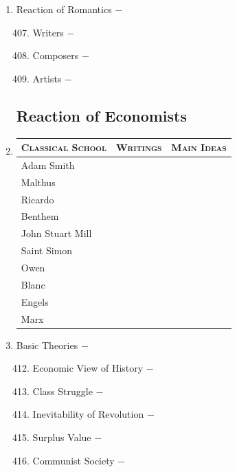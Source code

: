 \documentclass[12pt]{article}
\begin{document}
\begin{enumerate}
\item Reaction of Romantics $-$ 

\begin{enumerate}[label=\arabic{*}.]
\setcounter{enumii}{406}

\item Writers $-$ 

\item Composers $-$ 

\item Artists $-$  


\end{enumerate}
\setcounter{enumi}{409}

\subsection{Reaction of Economists}

\item \begin{tabular}{l c c}
\textsc{Classical School} & \textsc{Writings} & \textsc{Main Ideas} \\
\hline
Adam Smith & & \\
\hline
Malthus & & \\
\hline 
Ricardo & & \\
\hline
Benthem & & \\
\hline
John Stuart Mill & & \\
\hline
Saint Simon & & \\
\hline
Owen & & \\
\hline
Blanc & & \\
\hline
Engels & & \\
\hline
Marx & & \\
\end{tabular}

\item Basic Theories $-$

\begin{enumerate}[label=\arabic{*}.]
\setcounter{enumii}{411}

\item Economic View of History $-$

\item Class Struggle $-$

\item Inevitability of Revolution $-$ 

\item Surplus Value $-$

\item Communist Society $-$ 


\end{enumerate}
\end{enumerate}
\end{document}
